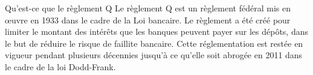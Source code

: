 \begin{frame}{Qu'est-ce que le règlement Q}
Le règlement Q est un règlement fédéral mis en œuvre en 1933 dans le cadre de la Loi bancaire. Le règlement a été créé pour limiter le montant des intérêts que les banques peuvent payer sur les dépôts, dans le but de réduire le risque de faillite bancaire. Cette réglementation est restée en vigueur pendant plusieurs décennies jusqu'à ce qu'elle soit abrogée en 2011 dans le cadre de la loi Dodd-Frank.
\end{frame}